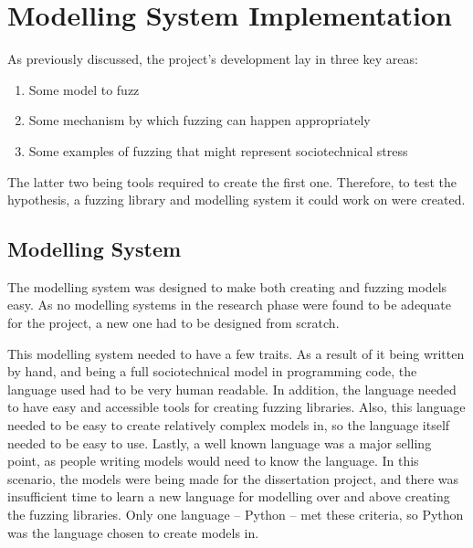 \chapter{Modelling System Implementation}
\label{modelling_implementation_head}
As previously discussed, the project's development lay in three key areas: 
\begin{enumerate}
    \item Some model to fuzz
    \item Some mechanism by which fuzzing can happen appropriately
    \item Some examples of fuzzing that might represent sociotechnical stress
\end{enumerate}\par

The latter two being tools required to create the first one. Therefore, to test the hypothesis, a fuzzing library and modelling system it could work on were created. 

\section{Modelling System}
\label{model_outline}
The modelling system was designed to make both creating and fuzzing models easy. As no modelling systems in the research phase were found to be adequate for the project, a new one had to be designed from scratch.\par

This modelling system needed to have a few traits. As a result of it being written by hand, and being a full sociotechnical model in programming code, the language used had to be very human readable. In addition, the language needed to have easy and accessible tools for creating fuzzing libraries. Also, this language needed to be easy to create relatively complex models in, so the language itself needed to be easy to use. Lastly, a well known language was a major selling point, as people writing models would need to know the language. In this scenario, the models were being made for the dissertation project, and there was insufficient time to learn a new language for modelling over and above creating the fuzzing libraries. Only one language -- Python -- met these criteria, so Python was the language chosen to create models in. \par%

